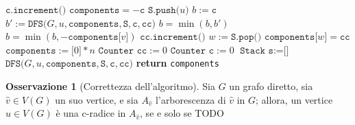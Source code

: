 \documentclass[14pt]{extreport}
\theoremstyle{definition}
\theoremstyle{definition}
\newtheorem{remark}{Osservazione}[subsection]
\begin{document}
\begin{algorithm}[H]
    \caption{
        Dato un grafo diretto $G$, rappresentato attraverso liste di adiacenza, l'algoritmo restituisce le componenti di $G$.\\
        \textbf{Input}: $G$ grafo diretto, rappresentato attraverso liste di adiacenza.\\
        \textbf{Output}: le componenti di $G$.
    }

    \begin{algorithmic}[1]
            \State $\texttt{c.increment()}$
            \State $\texttt{components} = - \texttt{c}$ 
            \State $\texttt{S.push(}u\texttt{)}$
            \State $b := \texttt{c}$
                    \State $b' := \texttt{DFS(}G, u, \texttt{components}, \texttt{S}, \texttt{c}, \texttt{cc)}$
                    \State $b = \min(b, b')$
                    \State $b = \min(b, - \texttt{components[}v\texttt{]})$
                \EndIf
            \EndFor
             
                \State $\texttt{cc.increment()}$
                \Do
                    \State $w := \texttt{S.pop()}$
                    \State $\texttt{components[}w\texttt{]} = \texttt{cc}$
            \EndIf
        \EndFunction
        \\
            \State $\texttt{components} := \texttt{[}0\texttt{]} * n$
            \State $\texttt{Counter cc} := 0$
            \State $\texttt{Counter c} := 0$
            \State $\texttt{Stack s} := \texttt{[}\texttt{]}$
                    \State $\texttt{DFS(}G, u, \texttt{components}, \texttt{S}, \texttt{c}, \texttt{cc)}$
                \EndIf
            \EndFor
            \State \textbf{return} \texttt{components}
        \EndFunction
    \end{algorithmic}
\end{algorithm}

\begin{remark}[Correttezza dell'algoritmo]
    Sia $G$ un grafo diretto, sia $\hat v \in V(G)$ un suo vertice, e sia $A_{\hat v}$ l'arborescenza di $\hat v$ in $G$; allora, un vertice $u \in V(G)$ è una c-radice in $A_{\hat v}$, se e solo se TODO
\end{remark}
\end{document}
